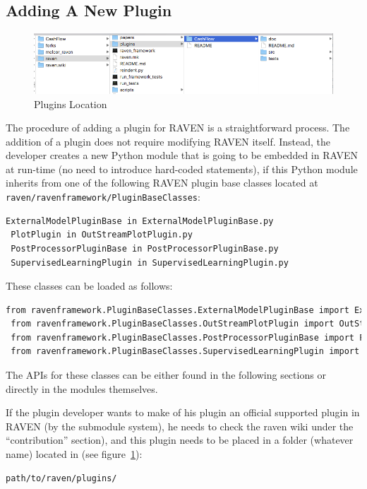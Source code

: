 \subsection{Adding A New Plugin}
\begin{figure}
\centering
\includegraphics[width=1.0\textwidth]{pics/plugins_location.png}
\caption{Plugins Location}
\label{fig:pluginsLocation}
\end{figure}
The procedure of adding a plugin for RAVEN is a straightforward process.
The addition of a plugin does not require modifying RAVEN itself.
Instead, the developer creates a new Python module that is going to be embedded
in RAVEN at run-time (no need to introduce  hard-coded statements), if this Python module
inherits from one of the following RAVEN plugin base classes located at \texttt{raven/ravenframework/PluginBaseClasses}:
\begin{lstlisting}[language=bash]
 ExternalModelPluginBase in ExternalModelPluginBase.py
 PlotPlugin in OutStreamPlotPlugin.py
 PostProcessorPluginBase in PostProcessorPluginBase.py
 SupervisedLearningPlugin in SupervisedLearningPlugin.py
\end{lstlisting}
These classes can be loaded as follows:
\begin{lstlisting}[language=bash]
 from ravenframework.PluginBaseClasses.ExternalModelPluginBase import ExternalModelPluginBase
 from ravenframework.PluginBaseClasses.OutStreamPlotPlugin import OutStreamPlotPlugin
 from ravenframework.PluginBaseClasses.PostProcessorPluginBase import PostProcessorPluginBase
 from ravenframework.PluginBaseClasses.SupervisedLearningPlugin import PlotPlugin
\end{lstlisting}
The APIs for these classes can be either found in the following sections or directly in the modules themselves.

If the plugin developer wants to make of his plugin
an official supported plugin in RAVEN (by the submodule system), he needs to check
the raven wiki under the ``contribution'' section), and this plugin needs to be placed in a folder (whatever name) located
in (see figure~\ref{fig:pluginsLocation}):
\begin{lstlisting}[language=bash]
 path/to/raven/plugins/
\end{lstlisting}
